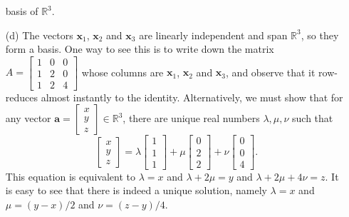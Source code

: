 \documentclass{amsart}
\newcommand{\R}         {{\mathbb{R}}}
\newcommand{\bsm}       {\left[\begin{smallmatrix}}
\newcommand{\esm}       {\end{smallmatrix}\right]}
\newcommand{\lm}        {\lambda}
\newcommand{\va}        {\mathbf{a}}
\newcommand{\vx}        {\mathbf{x}}
\renewcommand{\:}       {\colon}
\theoremstyle{definition}
\renewenvironment{solution}{\SolutionAtEnd}{\endSolutionAtEnd}
\begin{document}
\begin{solution}
\begin{itemize}
   basis of $\R^3$.
  \item[(d)] The vectors $\vx_1$, $\vx_2$ and $\vx_3$ are
   linearly independent and span $\R^3$, so they form a
   basis.  One way to see this is to write down the matrix
   $A=\bsm 1&0&0\\1&2&0\\1&2&4\esm$ whose columns are
   $\vx_1$, $\vx_2$ and $\vx_3$, and observe that it
   row-reduces almost instantly to the identity.
   Alternatively, we must show that for any vector
   $\va=\bsm x\\ y\\ z\esm\in\R^3$, there are unique real
   numbers $\lm,\mu,\nu$ such that 
   \[ \bsm x\\ y\\ z\esm =
       \lm\bsm 1\\1\\1\esm +
       \mu\bsm 0\\2\\2\esm +
       \nu\bsm 0\\0\\4\esm.
   \] 
   This equation is equivalent to $\lm=x$ and
   $\lm+2\mu=y$ and $\lm+2\mu+4\nu=z$.  It is easy to see that there is
   indeed a unique solution, namely $\lm=x$ and $\mu=(y-x)/2$ and
   $\nu=(z-y)/4$. 
 \end{itemize}
\end{solution}
\end{document}
